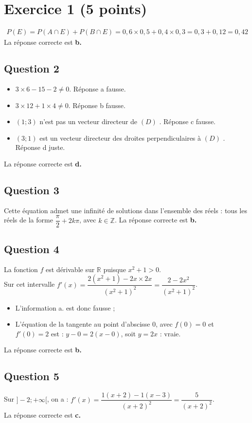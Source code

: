 \section*{Exercice 1 (5 points)}
	
\[
	\begin{array}{l}
		P(E) = P(A \cap E) + P(B \cap E) = 0,6 \times 0,5 + 0,4 \times 0,3 = 0,3 + 0,12 = 0,42
	\end{array}
	\]
La réponse correcte est \textbf{b.}
	
	\subsection*{Question 2}

	\begin{itemize}
		\item $3 \times 6 - 15 - 2 \neq 0.$ Réponse a fausse.
		\item	$3 \times 12 + 1 \times 4 \neq 0$. Réponse b fausse.
			\item $(1; 3)$  n’est pas un vecteur directeur de $(D)$ . Réponse c fausse.
			\item $(3; 1)$ est un vecteur directeur des droites perpendiculaires à  $(D)$ . Réponse d juste.
	\end{itemize}
La réponse correcte est \textbf{d.}
	
	\subsection*{Question 3}
Cette équation admet une infinité de solutions dans l’ensemble des réels : tous les réels de la forme $\dfrac{\pi}{2} + 2k\pi$, avec $k \in \mathbb{Z}$. La réponse correcte est \textbf{b.}
	
	\subsection*{Question 4}
La fonction $f$ est dérivable sur $\mathbb{R}$ puisque $x^2 + 1 > 0$.\\
Sur cet intervalle $f'(x) = \dfrac{2(x^2 + 1) - 2x \times 2x}{(x^2 + 1)^2} = \dfrac{2 - 2x^2}{(x^2 + 1)^2}$.
	
	\begin{itemize}
		\item L’information a. est donc fausse ;
		\item L’équation de la tangente au point d’abscisse 0, avec $f(0) = 0$ et $f'(0) = 2$ est : $y - 0 = 2(x - 0)$, soit $y = 2x$ : vraie.
	\end{itemize}
La réponse correcte est \textbf{b.}
	
	\subsection*{Question 5}
	
Sur $]-2; +\infty[$, on a : $f'(x) = \dfrac{1(x + 2) - 1(x - 3)}{(x + 2)^2} = \dfrac{5}{(x + 2)^2}$.\\
La réponse correcte est \textbf{c.}
